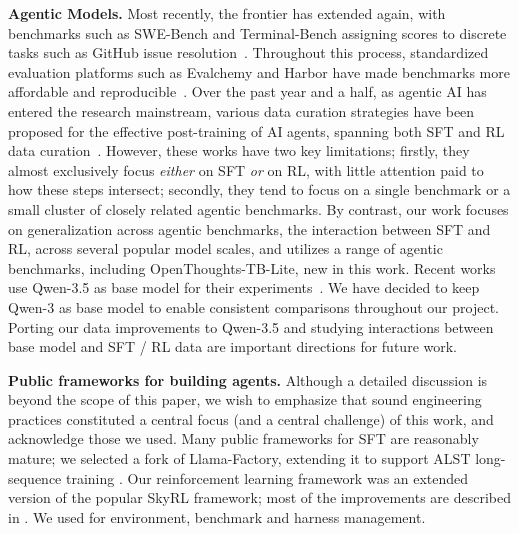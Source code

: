\documentclass{article}
\begin{document}
\textbf{Agentic Models.} Most recently, the frontier has extended again, with benchmarks such as SWE-Bench and Terminal-Bench assigning scores to discrete tasks such as GitHub issue resolution~\citep{ merrill2026terminalbenchbenchmarkingagentshard, jimenez2024swebenchlanguagemodelsresolve}. Throughout this process, standardized evaluation platforms such as Evalchemy and Harbor have made benchmarks more affordable and reproducible~\citep{Harbor_Framework, evalchemy}. Over the past year and a half, as agentic AI has entered the research mainstream, various data curation strategies have been proposed for the effective post-training of AI agents, spanning both SFT and RL data curation~\citep{yang2025swesmithscalingdatasoftware, gandhi2026endlessterminalsscalingrl, pi2026dataengineeringscalingllm, shen2026serasoftverifiedefficientrepository, zeng2026davincidevagentnativemidtrainingsoftware, deepswe2025, cao2025skyrlagentefficientrltraining}. 
However, these works have two key limitations; firstly, they almost exclusively focus \textit{either} on SFT \textit{or} on RL, with little attention paid to how these steps intersect; secondly, they tend to focus on a single benchmark or a small cluster of closely related agentic benchmarks.
By contrast, our work focuses on generalization across agentic benchmarks, the interaction between SFT and RL, across several popular model scales, and utilizes a range of agentic benchmarks, including OpenThoughts-TB-Lite, new in this work. Recent works use Qwen-3.5 as base model for their experiments~\citep{ivison2026tmaxsimplerecipeterminal}. We have decided to keep Qwen-3 as base model to enable consistent comparisons throughout our project. Porting our data improvements to Qwen-3.5 and studying interactions between base model and SFT / RL data are important directions for future work.

\textbf{Public frameworks for building agents.} Although a detailed discussion is beyond the scope of this paper, we wish to emphasize that sound engineering practices constituted a central focus (and a central challenge) of this work, and acknowledge those we used. Many public frameworks for SFT are reasonably mature; we selected a fork of Llama-Factory, extending it to support ALST long-sequence training \citep{zheng-etal-2024-llamafactory,bekman2025arcticlongsequencetraining}. Our reinforcement learning framework was an extended version of the popular SkyRL framework; most of the improvements are described in \cite{novasky2026skyrlharbor}. We used \cite{Harbor_Framework} for environment, benchmark and harness management.
\end{document}
